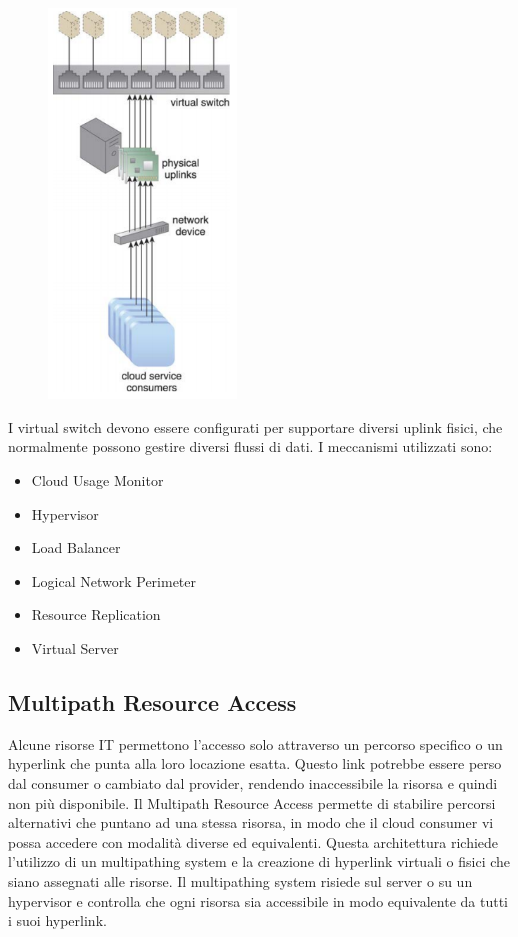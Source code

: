 \begin{figure}[htb!]
    \centering
    \includegraphics[width=5cm]{./Images/cap13/13.8.png}
\end{figure}

I virtual switch devono essere configurati per supportare diversi uplink fisici, che normalmente possono gestire diversi flussi di dati.
I meccanismi utilizzati sono:
\begin{itemize}
    \item Cloud Usage Monitor
    \item Hypervisor
    \item Load Balancer
    \item Logical Network Perimeter
    \item Resource Replication
    \item Virtual Server
\end{itemize}

\subsection{Multipath Resource Access}
Alcune risorse IT permettono l'accesso solo attraverso un percorso specifico o un hyperlink che punta alla loro locazione esatta. Questo link potrebbe essere perso dal consumer o cambiato dal provider, rendendo inaccessibile la risorsa e quindi non più disponibile. Il Multipath Resource Access permette di stabilire percorsi alternativi che puntano ad una stessa risorsa, in modo che il cloud consumer vi possa accedere con modalità diverse ed equivalenti. Questa architettura richiede l'utilizzo di un multipathing system e la creazione di hyperlink virtuali o fisici che siano assegnati alle risorse. Il multipathing system risiede sul server o su un hypervisor e controlla che ogni risorsa sia accessibile in modo equivalente da tutti i suoi hyperlink.

